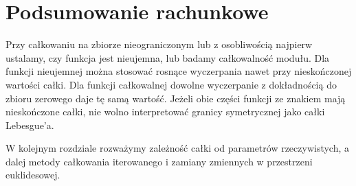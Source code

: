 \section{Podsumowanie rachunkowe}

Przy całkowaniu na zbiorze nieograniczonym
lub z osobliwością najpierw ustalamy,
czy funkcja jest nieujemna, lub badamy
całkowalność modułu. Dla funkcji nieujemnej
można stosować rosnące wyczerpania nawet
przy nieskończonej wartości całki.
Dla funkcji całkowalnej dowolne wyczerpanie
z dokładnością do zbioru zerowego daje
tę samą wartość. Jeżeli obie części
funkcji ze znakiem mają nieskończone
całki, nie wolno interpretować granicy
symetrycznej jako całki Lebesgue'a.

W kolejnym rozdziale rozważymy zależność
całki od parametrów rzeczywistych, a dalej
metody całkowania iterowanego i zamiany
zmiennych w przestrzeni euklidesowej.
